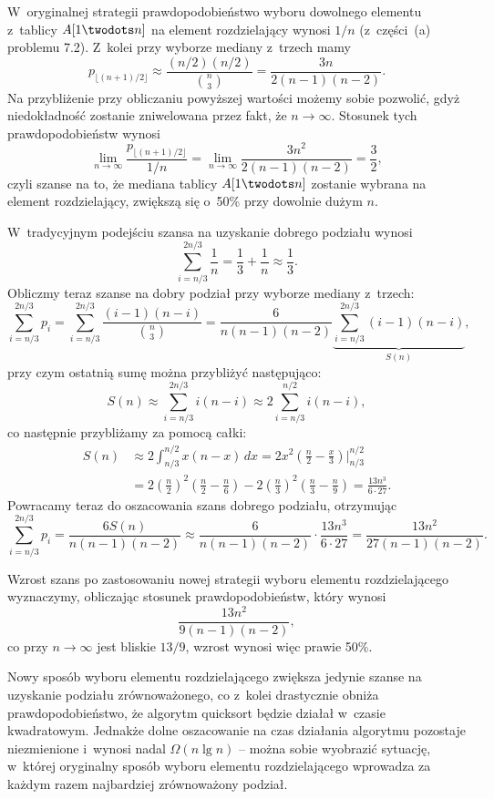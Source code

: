 \subproblem %
W~oryginalnej strategii prawdopodobieństwo wyboru dowolnego elementu z~tablicy $A[1\twodots n]$ na element rozdzielający wynosi $1/n$ (z~części~(a) problemu 7.2). Z~kolei przy wyborze mediany z~trzech mamy
\[
	p_{\lfloor(n+1)/2\rfloor} \approx \frac{(n/2)(n/2)}{\binom{n}{3}} = \frac{3n}{2(n-1)(n-2)}.
\]
Na przybliżenie przy obliczaniu powyższej wartości możemy sobie pozwolić, gdyż niedokładność zostanie zniwelowana przez fakt, że $n\to\infty$. Stosunek tych prawdopodobieństw wynosi
\[
	\lim_{n\to\infty}\frac{p_{\lfloor(n+1)/2\rfloor}}{1/n} = \lim_{n\to\infty}\frac{3n^2}{2(n-1)(n-2)} = \frac{3}{2},
\]
czyli szanse na to, że mediana tablicy $A[1\twodots n]$ zostanie wybrana na element rozdzielający, zwiększą się o~50\% przy dowolnie dużym $n$.

\subproblem %
W~tradycyjnym podejściu szansa na uzyskanie dobrego podziału wynosi
\[
	\sum_{i=n/3}^{2n/3}\frac{1}{n} = \frac{1}{3}+\frac{1}{n} \approx \frac{1}{3}.
\]
Obliczmy teraz szanse na dobry podział przy wyborze mediany z~trzech:
\[
	\sum_{i=n/3}^{2n/3}p_i = \sum_{i=n/3}^{2n/3}\frac{(i-1)(n-i)}{\binom{n}{3}} = \frac{6}{n(n-1)(n-2)}\underbrace{\sum_{i=n/3}^{2n/3}(i-1)(n-i)}_{S(n)},
\]
przy czym ostatnią sumę można przybliżyć następująco:
\[
	S(n) \approx \sum_{i=n/3}^{2n/3}i(n-i) \approx 2\sum_{i=n/3}^{n/2}i(n-i),
\]
co następnie przybliżamy za pomocą całki:
\begin{align*}
	S(n) &\approx 2\int_{n/3}^{n/2}x(n-x)\,dx = 2x^2\left(\frac{n}{2}-\frac{x}{3}\right)\Big|_{n/3}^{n/2} \\
	&= 2\left(\frac{n}{2}\right)^2\left(\frac{n}{2}-\frac{n}{6}\right)-2\left(\frac{n}{3}\right)^2\left(\frac{n}{3}-\frac{n}{9}\right) = \frac{13n^3}{6\cdot27}.
\end{align*}
Powracamy teraz do oszacowania szans dobrego podziału, otrzymując
\[
	\sum_{i=n/3}^{2n/3}p_i = \frac{6S(n)}{n(n-1)(n-2)} \approx \frac{6}{n(n-1)(n-2)}\cdot\frac{13n^3}{6\cdot27} = \frac{13n^2}{27(n-1)(n-2)}.
\]

Wzrost szans po zastosowaniu nowej strategii wyboru elementu rozdzielającego wyznaczymy, obliczając stosunek prawdopodobieństw, który wynosi
\[
	\frac{13n^2}{9(n-1)(n-2)},
\]
co przy $n\to\infty$ jest bliskie $13/9$, wzrost wynosi więc prawie 50\%.

\subproblem %
Nowy sposób wyboru elementu rozdzielającego zwiększa jedynie szanse na uzyskanie podziału zrównoważonego, co z~kolei drastycznie obniża prawdopodobieństwo, że algorytm quicksort będzie działał w~czasie kwadratowym. Jednakże dolne oszacowanie na czas działania algorytmu pozostaje niezmienione i~wynosi nadal $\Omega(n\lg n)$ -- można sobie wyobrazić sytuację, w~której oryginalny sposób wyboru elementu rozdzielającego wprowadza za każdym razem najbardziej zrównoważony podział.

